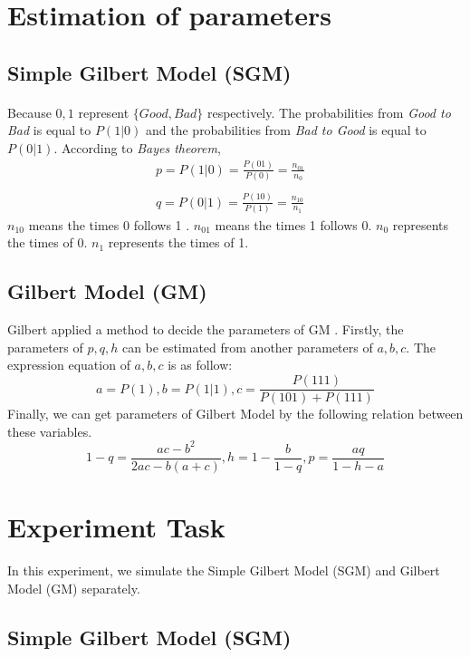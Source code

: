 \documentclass[11pt]{article}
\begin{document}
\section{Estimation of parameters}
\subsection{Simple Gilbert Model (SGM)}
\paragraph{}
Because $0,1$ represent $\{Good,Bad\}$ respectively. The probabilities from \emph{Good to Bad} is equal to $P(1|0)$ and 
the probabilities from \emph{Bad to Good} is equal to $P(0|1)$. According to \emph{Bayes theorem}, 
\begin{equation}
    \begin{array}{lr}
    p = P(1|0) = \frac{P(01)}{P(0)} = \frac{n_{01}}{n_0} &\\ \\
    q = P(0|1) = \frac{P(10)}{P(1)} = \frac{n_{10}}{n_1}
    \end{array}
\end{equation}
$n_{10}$ means the times 0 follows 1 . $n_{01}$ means the times 1 follows 0. $n_0$ represents the times of 0. $n_1$ represents the times of 1.
\subsection{Gilbert Model (GM)}
Gilbert applied a method to decide the parameters of GM \cite{Gilbert Model}.
Firstly, the parameters of ${p,q,h}$ can be estimated from another parameters of ${a,b,c}$. 
The expression equation of ${a,b,c}$ is as follow:
\begin{equation}
    a=P(1), b=P(1 | 1), c=\frac{P(111)}{P(101)+P(111)}
\end{equation}
Finally, we can get parameters of Gilbert Model by the following relation between these variables.
\begin{equation}
    1-q=\frac{a c-b^{2}}{2 a c-b(a+c)}, h=1-\frac{b}{1-q}, p=\frac{a q}{1-h-a}
\end{equation}

\section{Experiment Task}
In this experiment, we simulate the Simple Gilbert Model (SGM) and Gilbert Model (GM) separately.
\subsection{Simple Gilbert Model (SGM)}
\end{document}
